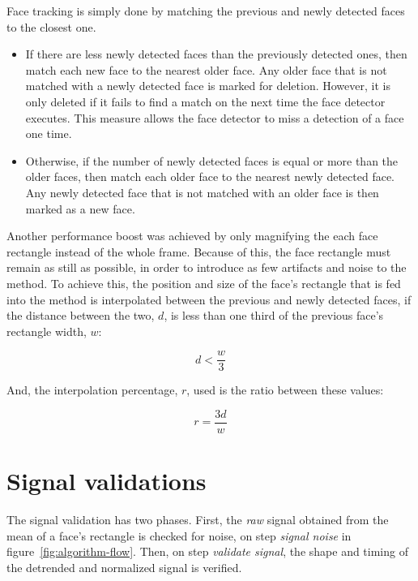 Face tracking is simply done by matching the previous and newly detected faces
to the closest one.
\begin{itemize}
  \item If there are less newly detected faces than the previously detected
        ones, then match each new face to the nearest older face. Any older
        face that is not matched with a newly detected face is marked for
        deletion. However, it is only deleted if it fails to find a match
        on the next time the face detector executes. This measure allows the
        face detector to miss a detection of a face one time.
  \item Otherwise, if the number of newly detected faces is equal or more than
        the older faces, then match each older face to the nearest newly
        detected face. Any newly detected face that is not matched with an
        older face is then marked as a new face.
\end{itemize}

Another performance boost was achieved by only magnifying the each face
rectangle instead of the whole frame. Because of this, the face rectangle must
remain as still as possible, in order to introduce as few artifacts and noise
to the \evm{} method. To achieve this, the position and size of the face's
rectangle that is fed into the \evm{} method is interpolated between the
previous and newly detected faces, if the distance between the two, $d$,
is less than one third of the previous face's rectangle width, $w$:

\begin{equation}
  d < \frac{w}{3}
\end{equation}

And, the interpolation percentage, $r$, used is the ratio between these values:

\begin{equation}
  r = \frac{3d}{w}
\end{equation}

\section{Signal validations} \label{sec:impl:validations}

The signal validation has two phases. First, the \emph{raw} signal
obtained from the mean of a face's rectangle is checked for noise,
on step \emph{signal noise} in figure~\ref{fig:algorithm-flow}.
Then, on step \emph{validate signal}, the shape and timing of the detrended
and normalized signal is verified.

